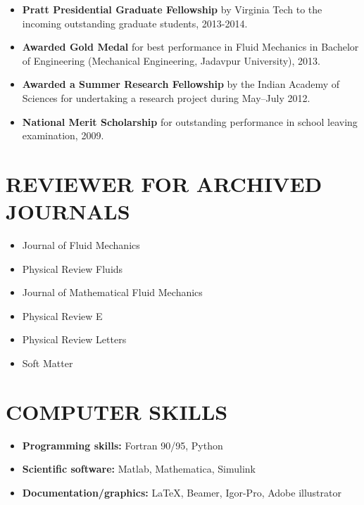 \documentclass[10pt]{res} %
\begin{document}
\begin{resume}
\begin{itemize}
		
		\item \textbf{Pratt Presidential Graduate Fellowship} by Virginia Tech to the incoming outstanding graduate students, 2013-2014.
		
		\item \textbf{Awarded Gold Medal} for best performance in Fluid Mechanics in Bachelor of Engineering (Mechanical Engineering, Jadavpur University), 2013.
		
		\item \textbf{Awarded a Summer Research Fellowship} by the Indian Academy of Sciences for undertaking a research project during May--July 2012.
		
     	\item \textbf{National Merit Scholarship} for outstanding performance in school leaving examination, 2009.
		\end{itemize}

\section{{REVIEWER FOR ARCHIVED JOURNALS}}
\vspace*{8mm}
\begin{multicols}{2}
\begin{itemize}
	\item Journal of Fluid Mechanics
	\item Physical Review Fluids
	\item Journal of Mathematical Fluid Mechanics
	\item Physical Review E
	\item Physical Review Letters
	\item Soft Matter
\end{itemize}
\end{multicols}
		

\section{{COMPUTER SKILLS}}

\vspace*{8mm}
\begin{itemize}
	\item \textbf{Programming skills:} Fortran 90/95, Python
	\item \textbf{Scientific software:} Matlab, Mathematica, Simulink
	\item \textbf{Documentation/graphics:} \LaTeX, Beamer, Igor-Pro, Adobe illustrator
\end{itemize}




\end{resume}
\end{document}
